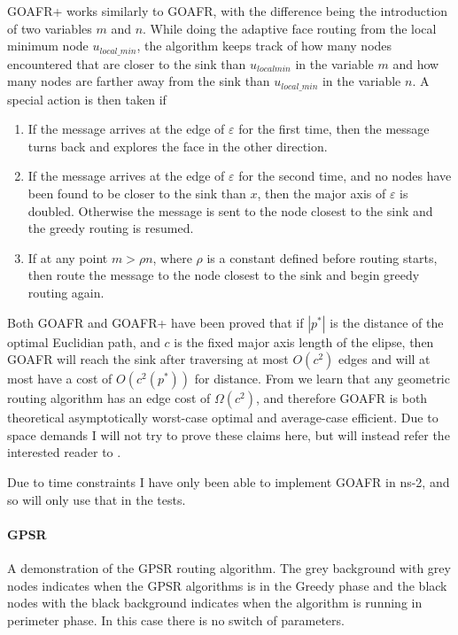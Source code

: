 GOAFR+ works similarly to GOAFR, with the difference being the introduction of two variables $m$ and $n$. While doing the adaptive face routing from the local minimum node $u_{local\_ min}$, the algorithm keeps track of how many nodes encountered that are closer to the sink than $u_{local min}$ in the variable $m$ and how many nodes are farther away from the sink than $u_{local\_min}$ in the variable $n$.
A special action is then taken if
\begin{enumerate}
\item If the message arrives at the edge of $\varepsilon$ for the first time, then the message turns back and explores the face in the other direction. 
\item If the message arrives at the edge of $\varepsilon$ for the second time, and no nodes have been found to be closer to the sink than $x$, then the major axis of $\varepsilon$ is doubled. Otherwise the message is sent to the node closest to the sink and the greedy routing is resumed.
\item If at any point $m > \rho n$, where $\rho$ is a constant defined before routing starts, then route the message to the node closest to the sink and begin greedy routing again.
\end{enumerate}

Both GOAFR and GOAFR+ have been proved that if $|p^*|$ is the distance of the optimal Euclidian path, and $c$ is the fixed major axis length of the elipse, then GOAFR will reach the sink after traversing at most $O(c^2)$ edges and will at most have a cost of $O(c^2(p^*))$ for distance. From \cite{asymp} we learn that any geometric routing algorithm has an edge cost of  $\Omega(c^2)$, and therefore GOAFR is both theoretical asymptotically worst-case optimal and average-case efficient. Due to space demands I will not try to prove these claims here, but will instead refer the interested reader to \cite{gopher+, asymp, gopher}.

Due to time constraints I have only been able to implement GOAFR in ns-2, and so will only use that in the tests.

\paragraph{GPSR}
{A demonstration of the GPSR routing algorithm. The grey background with grey nodes indicates when the GPSR algorithms is in the Greedy phase and the black nodes with the black background indicates when the algorithm is running in perimeter phase. In this case there is no switch of parameters.}

